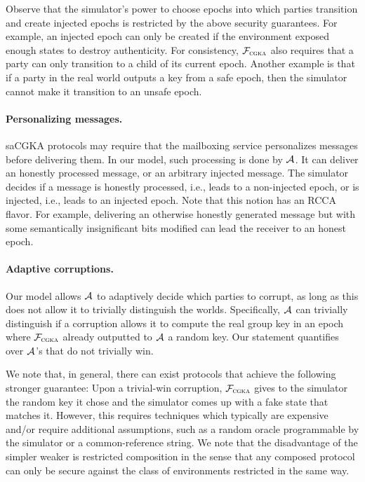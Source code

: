 Observe that the simulator's power to choose epochs into which parties transition and create injected epochs is restricted by the above security guarantees. For example, an injected epoch can only be created if the environment exposed enough states to destroy authenticity. For consistency, $\mathcal{F}_{\normalfont\textsc{cgka}}$ also requires that a party can only transition to a child of its current epoch. Another example is that if a party in the real world outputs a key from a safe epoch, then the simulator cannot make it transition to an unsafe epoch.

\paragraph{Personalizing messages.}
saCGKA protocols may require that the mailboxing service personalizes
messages before delivering them. In our model, such processing is done by
$\mathcal{A}_{\relax}$. It can deliver an honestly processed message, or an arbitrary
injected message. The simulator decides if a message is honestly processed,
i.e., leads to a non-injected epoch, or is injected, i.e., leads to an
injected epoch. Note that this notion has an RCCA flavor. For example,
delivering an otherwise honestly generated message but with some semantically
insignificant bits modified can lead the receiver to an honest epoch.


\paragraph{Adaptive corruptions.}
Our model allows $\mathcal{A}_{\relax}$ to adaptively decide which parties to corrupt, as long as this does not allow it to trivially distinguish the worlds. Specifically, $\mathcal{A}_{\relax}$ can trivially distinguish if a corruption allows it to compute the real group key in an epoch where $\mathcal{F}_{\normalfont\textsc{cgka}}$ already outputted to $\mathcal{A}_{\relax}$ a random key. Our statement quantifies over $\mathcal{A}_{\relax}$'s that do not trivially win.

We note that, in general, there can exist protocols that achieve the following stronger guarantee: Upon a trivial-win
corruption, $\mathcal{F}_{\normalfont\textsc{cgka}}$ gives to the simulator the random key it chose and the simulator comes up with a fake state that
matches it. However, this requires techniques which typically are expensive and/or require additional assumptions, such
as a random oracle programmable by the simulator or a common-reference string. We note that the disadvantage of the
simpler weaker is restricted composition in the sense that any composed protocol can only be secure against the class of environments restricted in the same way.

